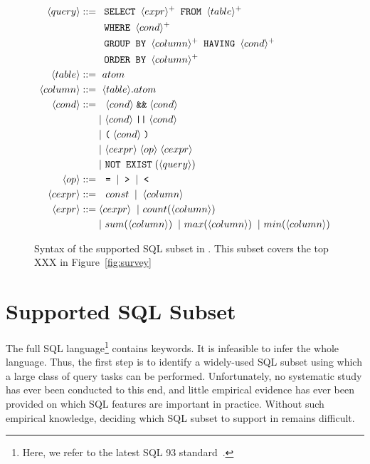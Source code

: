 \begin{figure}[t]
\footnotesize%
\begin{align*}
\langle query\rangle ::= {} 
	& \texttt{ SELECT } \langle expr\rangle^+ \texttt{ FROM } \langle table\rangle^+ \\
        & \texttt{ WHERE } \langle cond\rangle^+ \\ 
	&  \texttt{ GROUP BY } \langle column\rangle^+ \texttt{ HAVING } \langle cond\rangle^+\\
	&  \texttt{ ORDER BY } \langle column\rangle^+ \\
\langle table\rangle::= {} &\ atom \\
\langle column\rangle ::= {} &\ \langle table\rangle.atom\\
\langle cond\rangle ::= {} &\ \ \langle cond\rangle \;\texttt{\&\&}\; \langle cond\rangle \\ 
    & |\ \langle cond\rangle \;\texttt{||}\; \langle cond\rangle \\
    & |\ \texttt{(}\;\langle cond\rangle\;\texttt{)} \\
    & |\ \langle cexpr\rangle \;\langle op\rangle\; \langle cexpr\rangle \\
    & |\ \texttt{NOT EXIST} \;(\langle query\rangle) \\
\langle op\rangle ::= {} &\ \ \texttt{=} \;\;|\;\; \texttt{>}  \;\;|\;\; \texttt{<}\\
\langle cexpr\rangle ::= {} &\ \ const \;\;|\;\; \langle column\rangle  \;\; \\
\langle expr\rangle ::= {} & \langle cexpr\rangle \;\;|\ count(\langle column\rangle) \\
    & |\ sum(\langle column\rangle) \;\;|\ max(\langle column\rangle) \;\;|\ min(\langle column\rangle) 
\end{align*}
\normalsize%
\caption{Syntax of the supported SQL subset in \ourtool.
This subset covers the top XXX 
in Figure~\ref{fig:survey}}
\label{fig:syntax}
\end{figure}


\section{Supported SQL Subset}
\label{sec:langsubset}


The full SQL language\footnote{Here, we refer to
the latest SQL 93 standard~\cite{}.} contains
 keywords. It is infeasible to infer
the whole language.  Thus, the
first step is to identify a widely-used SQL
subset using which a large class of query tasks
can be performed. Unfortunately, no systematic
study has ever been conducted to this end,
and little empirical evidence has ever been provided
on which SQL features are important in practice.
Without such empirical knowledge, deciding which
SQL subset to support in \ourtool remains difficult.

